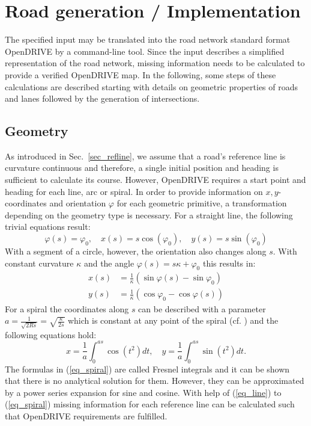 \documentclass[a4paper, 10pt, conference]{ieeeconf}      %
\begin{document}
\section{Road generation / Implementation}
The specified input may be translated into the road network standard format OpenDRIVE by a command-line tool. Since the input describes a simplified representation of the road network, missing information needs to be calculated to provide a verified OpenDRIVE map. In the following, some steps of these calculations are described starting with details on geometric properties of roads and lanes followed by the generation of intersections. 
\subsection{Geometry}\label{sec_geometry}
	As introduced in Sec.~\ref{sec_refline}, we assume that a road's reference line is curvature continuous and therefore, a single initial position and heading is sufficient to calculate its course. However, OpenDRIVE requires a start point and heading for each line, arc or spiral. In order to provide information on $x,y$-coordinates and orientation $\varphi$ for each geometric primitive, a transformation depending on the geometry type is necessary. For a straight line, the following trivial equations result:
    \begin{equation}
        \varphi(s) = \varphi_0, \quad x(s) = s \cos(\varphi_0), \quad y(s) = s \sin(\varphi_0) %
        \label{eq_line}
    \end{equation}
    With a segment of a circle, however, the orientation also changes along $s$. With constant curvature $\kappa$ and the angle $\varphi(s) = s \kappa + \varphi_0$ this results in:
    \begin{equation}
    \begin{split}
        x(s) &= \frac{1}{\kappa} \left(\sin\varphi(s) - \sin\varphi_0 \right)\\
        y(s) &= \frac{1}{\kappa} \left(\cos\varphi_0 - \cos\varphi(s) \right) %
    \end{split}
    \label{eq_arc}
    \end{equation}
    For a spiral the coordinates along $s$ can be described with a parameter \(a = \frac{1}{\sqrt{2Rs}} = \sqrt{\frac{\kappa}{2s}}\) which is constant at any point of the spiral (cf. \cite{Baier.2008}) and the following equations hold: 
    \begin{equation} 
        x = \frac{1}{a}\int_0^{as}  \cos\left(t^2\right)dt, \quad y = \frac{1}{a}\int_0^{as}  \sin\left(t^2\right)dt \text{.}
        \label{eq_spiral}
    \end{equation}
	The formulas in (\ref{eq_spiral}) are called Fresnel integrals and it can be shown that there is no analytical solution for them. However, they can be approximated by a power series expansion for sine and cosine. With help of (\ref{eq_line}) to (\ref{eq_spiral}) missing information for each reference line can be calculated such that OpenDRIVE requirements are fulfilled.
\end{document}
